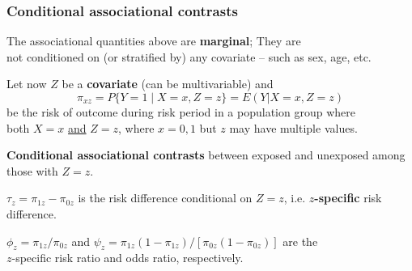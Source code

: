 \documentclass[12pt,dvipsnames,t,aspectratio=169, handout%
]{beamer}
\begin{document}
\begin{frame}
\frametitle{\large Conditional associational contrasts}

\bi
\item
The associational quantities above are \textbf{marginal}; 
They are \\ not conditioned on (or stratified by) any {covariate} -- such as sex, age, etc.
\pause
\medskip
\item
Let now $Z$ be a {\bf covariate} (can be multivariable)  and
$$ \pi_{xz} = P\{ Y=1 \mid  X=x, Z=z \} = E(Y|X=x, Z=z) $$  
be the risk of outcome during risk period in a population group where \\
both $X=x$ \underline{and} $Z=z$, where $x=0,1$ but $z$ may have multiple values.
\pause
\medskip
\item
 {\bf Conditional associational contrasts} 
between exposed and unexposed among those with $Z=z$.
\bi
{\normalsize
\item[--]
  $ \tau_z = \pi_{1z} - \pi_{0z}$ is the risk difference conditional on $Z=z$, i.e. {\bf $z$-specific} risk difference. 
\pause	
\medskip
\item[--]
$\phi_z = \pi_{1z}/\pi_{0z}$ and $\psi_z = \pi_{1z}(1-\pi_{1z})/[\pi_{0z}(1 - \pi_{0z})]$ are the  \\ $z$-specific risk ratio and odds ratio, respectively.
}
\ei

\ei 
\end{frame}
\end{document}
